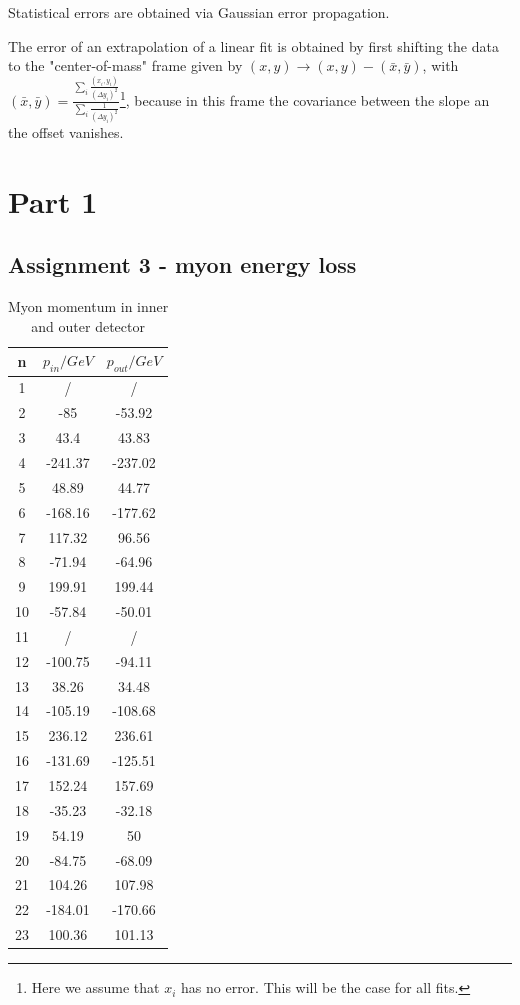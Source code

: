 Statistical errors are obtained via Gaussian error propagation. 

The error of an extrapolation of a linear fit is obtained by first shifting the data to the "center-of-mass" frame given by $(x,y) \to (x,y) - (\bar{x},\bar{y})$, with $(\bar{x},\bar{y}) = \frac{\sum_i \frac{(x_i,y_i)}{(\Delta y_i)^2}}{\sum_i \frac{1}{(\Delta y_i)^2}}$\footnote{Here we assume that $x_i$ has no error. This will be the case for all fits.}, because in this frame the covariance between the slope an the offset vanishes.

\section{Part 1}
\subsection{Assignment 3 - myon energy loss}

\begin{table}
\centering
\caption{Myon momentum in inner and outer detector}
\begin{tabular}{ccc}
\toprule
n & $p_{in}/\si{GeV}$ & $p_{out}/\si{GeV}$\\
\midrule
1 & / & /\\
2&	-85&	-53.92\\
3&	43.4&	43.83\\
4&	-241.37&	-237.02\\
5&	48.89&	44.77\\
6&	-168.16&	-177.62\\
7&	117.32&	96.56\\
8&	-71.94&	-64.96\\
9&	199.91&	199.44\\
10&	-57.84&	-50.01\\
11&	/ & /\\
12&-100.75&	-94.11\\
13&	38.26&	34.48\\
14&	-105.19&	-108.68\\
15&	236.12&	236.61\\
16&	-131.69&	-125.51\\
17&	152.24&	157.69\\
18&	-35.23&	-32.18\\
19&	54.19&	50\\
20&	-84.75&	-68.09\\
21&	104.26&	107.98\\
22&	-184.01&	-170.66\\
23&	100.36&	101.13\\
\bottomrule
\end{tabular}
\label{tab:task1_myon}
\end{table}

